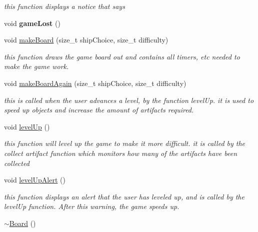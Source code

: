 \begin{DoxyCompactItemize}
\begin{DoxyCompactList}\small\item\em this function displays a notice that says \end{DoxyCompactList}\item 
\hypertarget{class_board_a711b6c329ce90171a9a7967e37b40036}{}void {\bfseries game\+Lost} ()\label{class_board_a711b6c329ce90171a9a7967e37b40036}

\item 
void \hyperlink{class_board_a955576b1437a029aeb3a60bf4a2f8b3c}{make\+Board} (size\+\_\+t ship\+Choice, size\+\_\+t difficulty)
\begin{DoxyCompactList}\small\item\em this function draws the game board out and contains all timers, etc needed to make the game work. \end{DoxyCompactList}\item 
void \hyperlink{class_board_a2d42f2f0900ed9116452e144169b39c4}{make\+Board\+Again} (size\+\_\+t ship\+Choice, size\+\_\+t difficulty)
\begin{DoxyCompactList}\small\item\em this is called when the user advances a level, by the function level\+Up. it is used to speed up objects and increase the amount of artifacts required. \end{DoxyCompactList}\item 
\hypertarget{class_board_a4873fb5c9ca5b89d3d63ef5478f364b7}{}void \hyperlink{class_board_a4873fb5c9ca5b89d3d63ef5478f364b7}{level\+Up} ()\label{class_board_a4873fb5c9ca5b89d3d63ef5478f364b7}

\begin{DoxyCompactList}\small\item\em this function will level up the game to make it more difficult. it is called by the collect artifact function which monitors how many of the artifacts have been collected \end{DoxyCompactList}\item 
\hypertarget{class_board_a58ce50ac6993078d8cd9efb8417a0dc2}{}void \hyperlink{class_board_a58ce50ac6993078d8cd9efb8417a0dc2}{level\+Up\+Alert} ()\label{class_board_a58ce50ac6993078d8cd9efb8417a0dc2}

\begin{DoxyCompactList}\small\item\em this function displays an alert that the user has leveled up, and is called by the level\+Up function. After this warning, the game speeds up. \end{DoxyCompactList}\item 
\hypertarget{class_board_af73f45730119a1fd8f6670f53f959e68}{}\hyperlink{class_board_af73f45730119a1fd8f6670f53f959e68}{$\sim$\+Board} ()\label{class_board_af73f45730119a1fd8f6670f53f959e68}


\end{DoxyCompactItemize}
